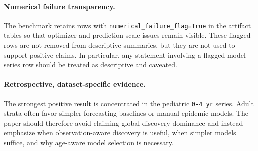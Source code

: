\paragraph{Numerical failure transparency.}
The benchmark retains rows with \texttt{numerical\_failure\_flag=True} in the
artifact tables so that optimizer and prediction-scale issues remain visible.
These flagged rows are not removed from descriptive summaries, but they are
not used to support positive claims. In particular, any statement involving a
flagged model-series row should be treated as descriptive and caveated.

\paragraph{Retrospective, dataset-specific evidence.}
The strongest positive result is concentrated in the pediatric
\texttt{0-4 yr} series. Adult strata often favor simpler forecasting baselines
or manual epidemic models. The paper should therefore avoid claiming global
discovery dominance and instead emphasize when observation-aware discovery is
useful, when simpler models suffice, and why age-aware model selection is
necessary.
